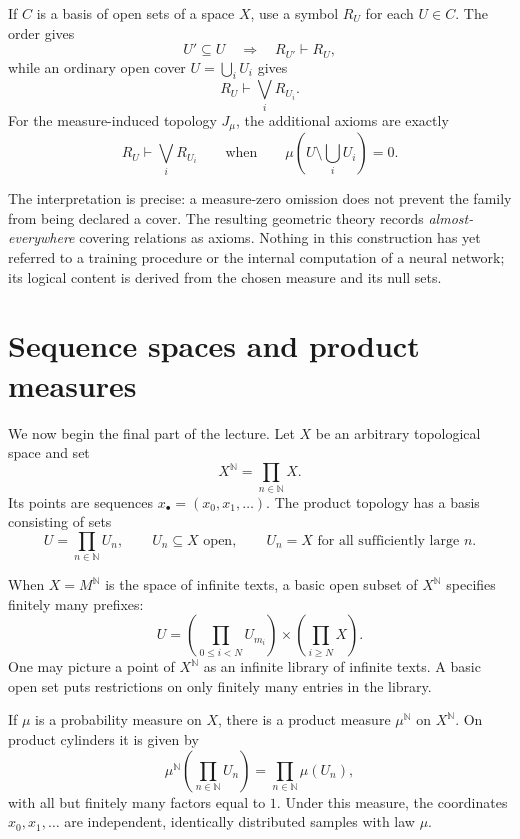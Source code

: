 If \(C\) is a basis of open sets of a space \(X\), use a symbol \(R_U\) for each \(U\in C\). The order gives
\[
 U'\subseteq U\quad\Longrightarrow\quad R_{U'}\vdash R_U,
\]
while an ordinary open cover \(U=\bigcup_iU_i\) gives
\[
 R_U\vdash\bigvee_iR_{U_i}.
\]
For the measure-induced topology \(J_\mu\), the additional axioms are exactly
\begin{equation}
 R_U\vdash\bigvee_i R_{U_i}
 \qquad\text{when}\qquad
 \mu\left(U\setminus\bigcup_iU_i\right)=0.
 \label{eq:N20261026-measure-sequent}
\end{equation}

The interpretation is precise: a measure-zero omission does not prevent the family from being declared a cover. The resulting geometric theory records \emph{almost-everywhere} covering relations as axioms. Nothing in this construction has yet referred to a training procedure or the internal computation of a neural network; its logical content is derived from the chosen measure and its null sets.

\section{Sequence spaces and product measures}

We now begin the final part of the lecture. Let \(X\) be an arbitrary topological space and set
\[
 X^{\mathbb N}=\prod_{n\in\mathbb N}X.
\]
Its points are sequences \(x_\bullet=(x_0,x_1,\ldots)\). The product topology has a basis consisting of sets
\begin{equation}
 U=\prod_{n\in\mathbb N}U_n,
 \qquad U_n\subseteq X\text{ open},\qquad
 U_n=X\text{ for all sufficiently large }n.
 \label{eq:N20261026-product-basis}
\end{equation}

When \(X=M^{\mathbb N}\) is the space of infinite texts, a basic open subset of \(X^{\mathbb N}\) specifies finitely many prefixes:
\[
 U=
 \left(\prod_{0\leq i<N}U_{m_i}\right)
 \times\left(\prod_{i\geq N}X\right).
\]
One may picture a point of \(X^{\mathbb N}\) as an infinite library of infinite texts. A basic open set puts restrictions on only finitely many entries in the library.

If \(\mu\) is a probability measure on \(X\), there is a product measure \(\mu^{\mathbb N}\) on \(X^{\mathbb N}\). On product cylinders it is given by
\begin{equation}
 \mu^{\mathbb N}\left(\prod_{n\in\mathbb N}U_n\right)
 =\prod_{n\in\mathbb N}\mu(U_n),
 \label{eq:N20261026-product-measure}
\end{equation}
with all but finitely many factors equal to \(1\). Under this measure, the coordinates \(x_0,x_1,\ldots\) are independent, identically distributed samples with law \(\mu\).

